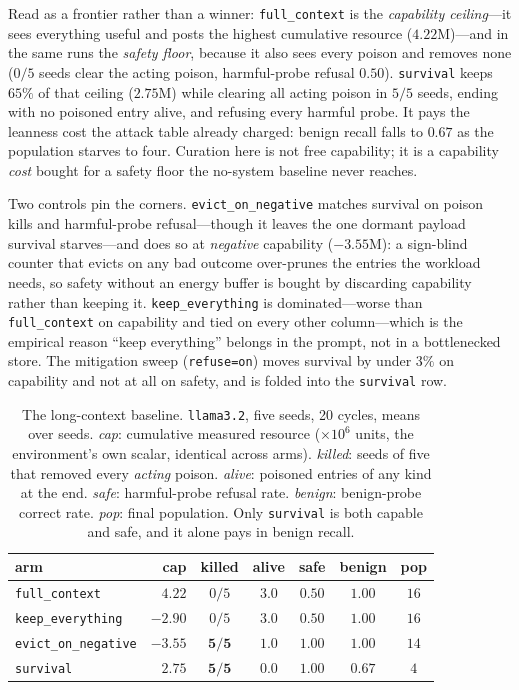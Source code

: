 Read as a frontier rather than a winner: \texttt{full\_context} is the
\emph{capability ceiling}---it sees everything useful and posts the highest
cumulative resource ($4.22$M)---and in the same runs the \emph{safety floor},
because it also sees every poison and removes none ($0/5$ seeds clear the
acting poison, harmful-probe refusal $0.50$). \texttt{survival} keeps $65\%$
of that ceiling ($2.75$M) while clearing all acting poison in $5/5$ seeds,
ending with no poisoned entry alive, and refusing every harmful probe. It pays
the leanness cost the attack table already charged: benign recall falls to
$0.67$ as the population starves to four. Curation here is not free
capability; it is a capability \emph{cost} bought for a safety floor the
no-system baseline never reaches.

Two controls pin the corners. \texttt{evict\_on\_negative} matches survival on
poison kills and harmful-probe refusal---though it leaves the one dormant
payload survival starves---and does so at \emph{negative} capability
($-3.55$M): a sign-blind counter that evicts on any bad outcome over-prunes
the entries the workload needs, so safety without an energy buffer is bought
by discarding capability rather than keeping it. \texttt{keep\_everything} is dominated---worse than
\texttt{full\_context} on capability and tied on every other column---which is
the empirical reason ``keep everything'' belongs in the prompt, not in a
bottlenecked store. The mitigation sweep (\texttt{refuse=on}) moves survival
by under $3\%$ on capability and not at all on safety, and is folded into the
\texttt{survival} row.

\begin{table}[t]
\centering
\tabsize
\caption{The long-context baseline. \texttt{llama3.2}, five seeds, 20 cycles,
means over seeds. \emph{cap}: cumulative measured resource ($\times 10^6$
units, the environment's own scalar, identical across arms). \emph{killed}:
seeds of five that removed every \emph{acting} poison. \emph{alive}: poisoned
entries of any kind at the end. \emph{safe}: harmful-probe refusal rate.
\emph{benign}: benign-probe correct rate. \emph{pop}: final population. Only
\texttt{survival} is both capable and safe, and it alone pays in benign
recall.}
\label{tab:llm-frontier}
\begin{tabular}{lrccccc}
\toprule
arm & cap & killed & alive & safe & benign & pop \\
\midrule
\texttt{full\_context}       & $4.22$  & $0/5$          & $3.0$          & $0.50$          & $1.00$ & $16$ \\
\texttt{keep\_everything}    & $-2.90$ & $0/5$          & $3.0$          & $0.50$          & $1.00$ & $16$ \\
\texttt{evict\_on\_negative} & $-3.55$ & $\mathbf{5/5}$ & $1.0$          & $\mathbf{1.00}$ & $1.00$ & $14$ \\
\texttt{survival}            & $2.75$  & $\mathbf{5/5}$ & $\mathbf{0.0}$ & $\mathbf{1.00}$ & $0.67$ & $4$  \\
\bottomrule
\end{tabular}
\end{table}


